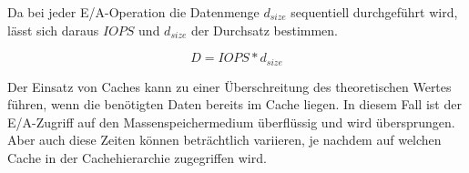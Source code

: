 Da bei jeder E/A-Operation die Datenmenge $d_{size}$ sequentiell durchgeführt wird, lässt sich daraus $IOPS$ und $d_{size}$ der Durchsatz bestimmen.

\begin{equation}
	D = IOPS * d_{size}
\end{equation}

Der Einsatz von Caches kann zu einer Überschreitung des theoretischen Wertes führen, wenn die benötigten Daten bereits im Cache liegen. In diesem Fall ist der E/A-Zugriff auf den Massenspeichermedium überflüssig und wird übersprungen. Aber auch diese Zeiten können beträchtlich variieren, je nachdem auf welchen Cache in der Cachehierarchie zugegriffen wird. 







